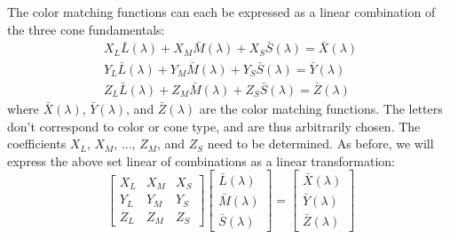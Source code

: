 \documentclass[twocolumn]{article}
\begin{document}
The color matching functions can each be expressed as a linear combination of the three cone fundamentals:
\begin{equation}
    \begin{aligned}
        X_L\bar{L}(\lambda)+X_M\bar{M}(\lambda)+X_S\bar{S}(\lambda)=\bar{X}(\lambda)\\
        Y_L\bar{L}(\lambda)+Y_M\bar{M}(\lambda)+Y_S\bar{S}(\lambda)=\bar{Y}(\lambda)\\
        Z_L\bar{L}(\lambda)+Z_M\bar{M}(\lambda)+Z_S\bar{S}(\lambda)=\bar{Z}(\lambda)
    \end{aligned}
\end{equation}
where $\bar{X}(\lambda)$, $\bar{Y}(\lambda)$, and $\bar{Z}(\lambda)$ are the color matching functions.  The letters don't correspond to color or cone type, and are thus arbitrarily chosen.  The coefficients $X_L$, $X_M$, ..., $Z_M$, and $Z_S$ need to be determined.  As before, we will express the above set linear of combinations as a linear transformation:
\begin{equation}
    \begin{bmatrix}
        X_L&X_M&X_S\\
        Y_L&Y_M&Y_S\\
        Z_L&Z_M&Z_S
    \end{bmatrix}\begin{bmatrix}
        \bar{L}(\lambda)\\
        \bar{M}(\lambda)\\
        \bar{S}(\lambda)
    \end{bmatrix}=\begin{bmatrix}
        \bar{X}(\lambda)\\
        \bar{Y}(\lambda)\\
        \bar{Z}(\lambda)
    \end{bmatrix}
\end{equation}
\end{document}

